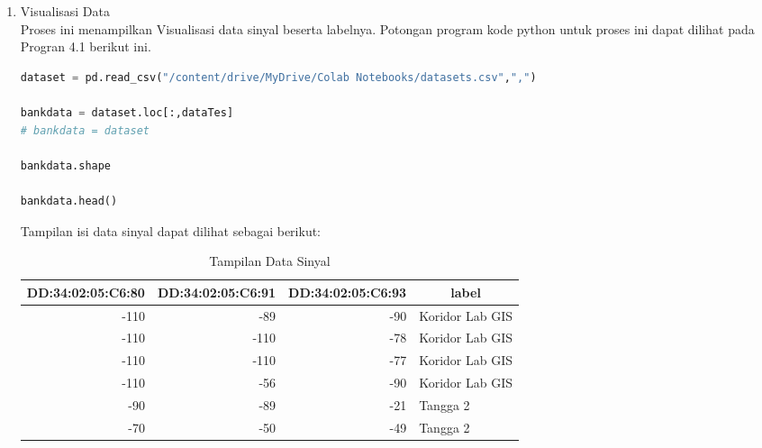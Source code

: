 \begin{enumerate} [1.]
	\item Visualisasi Data
	      \\ Proses ini menampilkan Visualisasi data sinyal beserta labelnya. Potongan program kode python untuk proses ini dapat dilihat pada Progran 4.1 berikut ini.
	      \\
	      \begin{lstlisting}[label=MinMAxdanPCA,language=Python]
dataset = pd.read_csv("/content/drive/MyDrive/Colab Notebooks/datasets.csv",",")

bankdata = dataset.loc[:,dataTes]
# bankdata = dataset

bankdata.shape

bankdata.head()
					\end{lstlisting}

	      \par Tampilan isi data sinyal dapat dilihat sebagai berikut:

	      \begin{table}[H]
		      \center
		      \fontsize{10}{12}\selectfont
		      \caption{Tampilan Data Sinyal}
		      \label{Daftar-Peserta-Pengumpula-Data}
		      \begin{tabular}{|r|r|r|l|}
			      \hline
			      \multicolumn{1}{|l|}{DD:34:02:05:C6:80} & \multicolumn{1}{l|}{DD:34:02:05:C6:91} & \multicolumn{1}{l|}{DD:34:02:05:C6:93} & \multicolumn{1}{c|}{label} \\ \hline
			      -110                                    & -89                                    & -90                                    & Koridor Lab GIS            \\ \hline
			      -110                                    & -110                                   & -78                                    & Koridor Lab GIS            \\ \hline
			      -110                                    & -110                                   & -77                                    & Koridor Lab GIS            \\ \hline
			      -110                                    & -56                                    & -90                                    & Koridor Lab GIS            \\ \hline
			      -90                                     & -89                                    & -21                                    & Tangga 2                   \\ \hline
			      -70                                     & -50                                    & -49                                    & Tangga 2                   \\ \hline
		      \end{tabular}
	      \end{table}


\end{enumerate}
